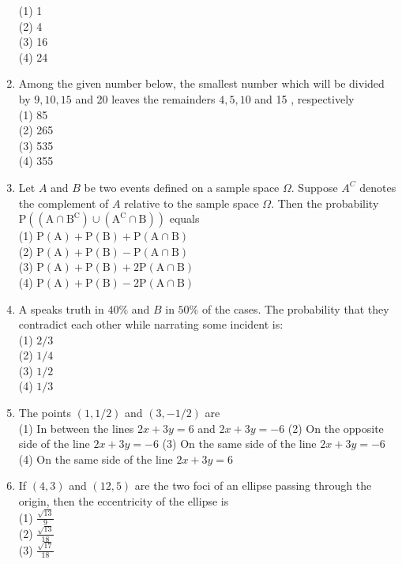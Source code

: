 \documentclass[10pt]{article}
\begin{document}
\begin{enumerate}
(1) 1\\
(2) 4\\
(3) 16\\
(4) 24
  \item Among the given number below, the smallest number which will be divided by $9,10,15$ and 20 leaves the remainders $4,5,10$ and 15 , respectively\\
(1) 85\\
(2) 265\\
(3) 535\\
(4) 355
  \item Let $A$ and $B$ be two events defined on a sample space $\Omega$. Suppose $A^{C}$ denotes the complement of $A$ relative to the sample space $\Omega$. Then the probability $\mathrm{P}\left(\left(\mathrm{A} \cap \mathrm{B}^{\mathrm{C}}\right) \cup\left(\mathrm{A}^{\mathrm{C}} \cap \mathrm{B}\right)\right)$ equals\\
(1) $\mathrm{P}(\mathrm{A})+\mathrm{P}(\mathrm{B})+\mathrm{P}(\mathrm{A} \cap \mathrm{B})$\\
(2) $\mathrm{P}(\mathrm{A})+\mathrm{P}(\mathrm{B})-\mathrm{P}(\mathrm{A} \cap \mathrm{B})$\\
(3) $\mathrm{P}(\mathrm{A})+\mathrm{P}(\mathrm{B})+2 \mathrm{P}(\mathrm{A} \cap \mathrm{B})$\\
(4) $\mathrm{P}(\mathrm{A})+\mathrm{P}(\mathrm{B})-2 \mathrm{P}(\mathrm{A} \cap \mathrm{B})$
  \item A speaks truth in $40 \%$ and $B$ in $50 \%$ of the cases. The probability that they contradict each other while narrating some incident is:\\
(1) $2 / 3$\\
(2) $1 / 4$\\
(3) $1 / 2$\\
(4) $1 / 3$
  \item The points $(1,1 / 2)$ and $(3,-1 / 2)$ are\\
(1) In between the lines $2 x+3 y=6$ and $2 x+3 y=-6$ (2) On the opposite side of the line $2 x+3 y=-6$ (3) On the same side of the line $2 x+3 y=-6$\\
(4) On the same side of the line $2 x+3 y=6$
  \item If $(4,3)$ and $(12,5)$ are the two foci of an ellipse passing through the origin, then the eccentricity of the ellipse is\\
(1) $\frac{\sqrt{13}}{9}$\\
(2) $\frac{\sqrt{13}}{18}$\\
(3) $\frac{\sqrt{17}}{18}$\\

\end{enumerate}
\end{document}
